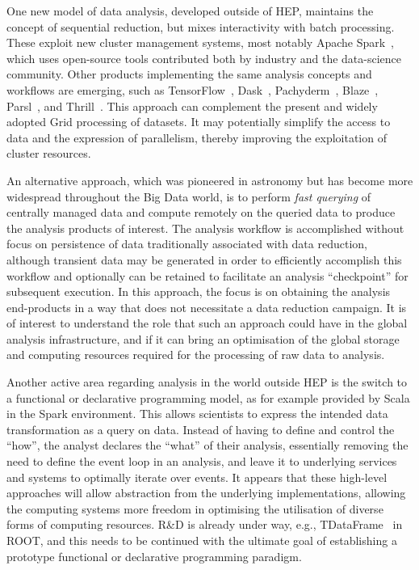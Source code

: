 One new model of data analysis, developed outside of HEP, maintains the
concept of sequential reduction, but mixes interactivity with
batch processing. These exploit new cluster management systems, most
notably Apache Spark~\cite{Armbrust:2015:SSR:2723372.2742797}, which uses open-source tools contributed both by
industry and the data-science community. Other products implementing the
same analysis concepts and workflows are emerging, such as TensorFlow~\cite{tensorflow2015-whitepaper},
Dask~\cite{dask_ref}, Pachyderm~\cite{thepachydermteam}, 
Blaze~\cite{blaze}, Parsl~\cite{babuji_yadu_2017_853492}, 
and Thrill~\cite{bingmann2016thrill}. This approach can complement
the present and widely adopted Grid processing of datasets. It may
potentially simplify the access to data and the expression of
parallelism, thereby improving the exploitation of cluster resources.

An alternative approach, which was pioneered in astronomy but has become
more widespread throughout the Big Data world, is to perform \emph{fast
querying} of centrally managed data and compute remotely on the queried
data to produce the analysis products of interest. The analysis workflow
is accomplished without focus on persistence of data traditionally
associated with data reduction, although transient data may be generated
in order to efficiently accomplish this workflow and optionally can be
retained to facilitate an analysis ``checkpoint'' for subsequent
execution. In this approach, the focus is on obtaining the analysis
end-products in a way that does not necessitate a data reduction
campaign. It is of interest to understand the role
that such an approach could have in the global analysis infrastructure,
and if it can bring an optimisation of the global storage and computing
resources required for the processing of raw data to analysis.

Another active area regarding analysis in the world outside HEP is the
switch to a functional or declarative programming model, as for example
provided by Scala in the Spark environment. This allows scientists to
express the intended data transformation as a query on data. Instead of
having to define and control the ``how'', the analyst declares the
``what'' of their analysis, essentially removing the need to define the
event loop in an analysis, and leave it to underlying services and
systems to optimally iterate over events. It appears that these
high-level approaches will allow abstraction from the underlying
implementations, allowing the computing systems more freedom in
optimising the utilisation of diverse forms of computing resources. R\&D
is already under way, e.g., TDataFrame~\cite{TDataFrame} in ROOT, and
this needs to be continued with the ultimate goal of establishing a
prototype functional or declarative programming paradigm.

